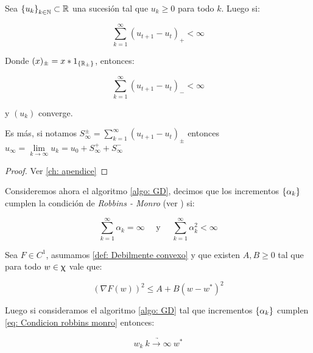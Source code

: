 \begin{lemma}
	\label{lemma: Convergencia de sucesiones positivas acotadas sumables}
	Sea $\left\lbrace u_k\right\rbrace_{k \in {\mathbb{N}}} \subset {\mathbb{R}}$ una sucesi\'on tal que $u_k \geq 0$ para todo $k$. Luego si:
	
	\begin{equation*}
		\sum\limits_{k=1}^{\infty} {\left(u_{t+1} - u_t\right)_{+}} < \infty
	\end{equation*}
	
	Donde $(x)_{\pm} = x * 1_{\left\lbrace{\mathbb{R}}_{\pm}\right\rbrace}$, entonces:
	
	\begin{equation*}
		\sum\limits_{k=1}^{\infty} {\left(u_{t+1} - u_t\right)_{-}} < \infty
	\end{equation*}
	
	 y $\left(u_k\right)$ converge. 
	 
	 Es m\'as, si notamos $S^{\pm}_{\infty} = \sum\limits_{k=1}^{\infty}  {\left(u_{t+1} - u_t\right)_{\pm}} $ entonces $u_{\infty} = \lim\limits_{k \rightarrow \infty} {u_k} = u_0 + S_{\infty}^+ + S_{\infty}^-$
\end{lemma}

\begin{proof}
	Ver \ref{ch: apendice}
\end{proof}

Consideremos ahora el algoritmo \ref{algo: GD}, decimos que los incrementos $\left\lbrace\alpha_k\right\rbrace$  cumplen la condici\'on de \textit{Robbins - Monro} (ver \cite{robbins:1951}) si:

\begin{equation}
\label{eq: Condicion robbins monro}
\sum\limits_{k=1}^{\infty} {\alpha_k} = \infty \quad \text{ y } \quad \sum\limits_{k=1}^{\infty} {\alpha_k^2} < \infty
\end{equation}

\begin{theorem}
	Sea $F \in C^1$, asumamos \ref{def: Debilmente convexo} y que existen $A,B \geq 0$ tal que para todo $w \in \upchi$ vale que:
	
	\begin{equation}
	\label{eq: Condicion gradiente acotado, ctp, batch}
		\left(\nabla F(w)\right)^2 \leq A + B \left(w - w^*\right)^2
	\end{equation}
	
	Luego si consideramos el algoritmo \ref{algo: GD} tal que incrementos $\left\lbrace\alpha_k\right\rbrace$  cumplen \ref{eq: Condicion robbins monro} entonces:
	
	\begin{equation}
		w_k \ \underrightarrow{k \rightarrow \infty} \ w^*
	\end{equation}
	
\end{theorem}

